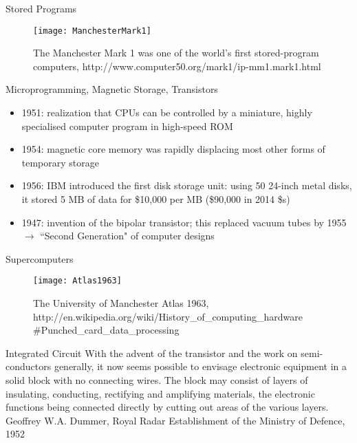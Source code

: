 \documentclass[xcolor=x11names,compress]{beamer}
\renewcommand{\(}{\begin{columns}}
\renewcommand{\)}{\end{columns}}
\newcommand{\<}[1]{\begin{column}{#1}}
\renewcommand{\>}{\end{column}}
\begin{document}
\begin{frame}{Stored Programs}

\begin{figure}
\texttt{[image: ManchesterMark1]}
\caption{The Manchester Mark 1 was one of the world's first stored-program computers, http://www.computer50.org/mark1/ip-mm1.mark1.html}
\end{figure}

\end{frame}

\begin{frame}{Microprogramming, Magnetic Storage, Transistors}
\begin{itemize}
\item 1951: realization that CPUs can be controlled by a miniature, highly specialised computer program in high-speed ROM
\item 1954: magnetic core memory was rapidly displacing most other forms of temporary storage
\item 1956: IBM introduced the first disk storage unit: using 50 24-inch metal disks, it stored 5 MB of data for \$10,000 per MB (\$90,000 in 2014 \$s)
\item 1947: invention of the bipolar transistor; this replaced vacuum tubes by 1955 $\rightarrow$ ``Second Generation" of computer designs
\end{itemize}
\end{frame}

\begin{frame}{Supercomputers}

\begin{figure}
\texttt{[image: Atlas1963]}
\caption{The University of Manchester Atlas 1963, http://en.wikipedia.org/wiki/History\_of\_computing\_hardware
\#Punched\_card\_data\_processing}
\end{figure}

\end{frame}

\begin{frame}{Integrated Circuit}
With the advent of the transistor and the work on semi-conductors generally, it now seems possible to envisage electronic equipment in a solid block with no connecting wires. The block may consist of layers of insulating, conducting, rectifying and amplifying materials, the electronic functions being connected directly by cutting out areas of the various layers.\\
\vspace*{1.5 em}
\hspace*{0.5 in}Geoffrey W.A. Dummer, Royal Radar Establishment of the Ministry of Defence, 1952

\end{frame}
\end{document}
